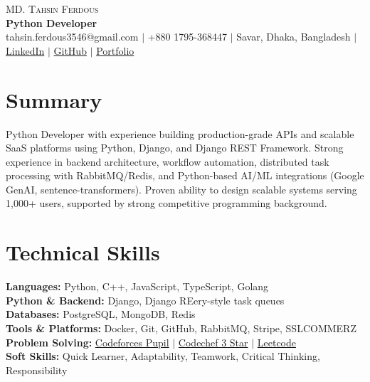 \documentclass[letterpaper,10.5pt]{article}
\begin{document}
\begin{center}
    {\LARGE \scshape MD. Tahsin Ferdous} \\ \vspace{4pt}
    {\large\bfseries Python Developer} \\ \vspace{6pt}
    \small
    tahsin.ferdous3546@gmail.com $|$
    +880 1795-368447 $|$
    Savar, Dhaka, Bangladesh $|$
    \href{https://www.linkedin.com/in/md-tahsin-ferdous/}{LinkedIn} $|$
    \href{https://github.com/tahsin005}{GitHub} $|$
    \href{https://tahsin-exe.vercel.app/}{Portfolio}
\end{center}

\section{Summary}
\small{
Python Developer with experience building production-grade APIs and scalable SaaS platforms using {Python, Django, and Django REST Framework}. Strong experience in backend architecture, workflow automation, distributed task processing with RabbitMQ/Redis, and Python-based AI/ML integrations (Google GenAI, sentence-transformers). Proven ability to design scalable systems serving 1,000+ users, supported by strong competitive programming background.
}


\section{Technical Skills}
 \begin{itemize}[leftmargin=0.15in, label={}]
    \small{\item{
     \textbf{Languages:}{ Python, C++, JavaScript, TypeScript, Golang} \\[2pt]
     \textbf{Python \& Backend:}{ Django, Django REery-style task queues} \\[2pt]
     \textbf{Databases:}{ PostgreSQL, MongoDB, Redis} \\[2pt]
     \textbf{Tools \& Platforms:}{ Docker, Git, GitHub, RabbitMQ, Stripe, SSLCOMMERZ} \\[2pt]
     \textbf{Problem Solving:} \href{https://codeforces.com/profile/tahsin_ferdous}{Codeforces Pupil} $|$  \href{https://www.codechef.com/users/tahsinferdous3}{Codechef 3 Star}  $|$  \href{https://leetcode.com/u/md-tahsin-ferdous/}{Leetcode} \\[2pt]
     \textbf{Soft Skills:}{ Quick Learner, Adaptability, Teamwork, Critical Thinking, Responsibility}
    }}
 \end{itemize}
\end{document}
